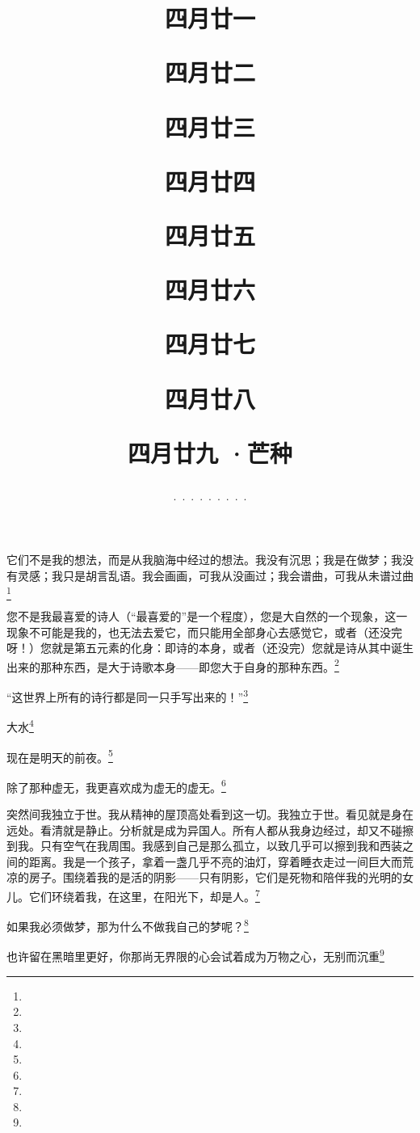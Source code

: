 \title{\date[d=28,m=5,y=2024][year:cn-y,年,month:cn,day:cn,日,·,weekday]·四月廿一 }
它们不是我的想法，而是从我脑海中经过的想法。我没有沉思；我是在做梦；我没有灵感；我只是胡言乱语。我会画画，可我从没画过；我会谱曲，可我从未谱过曲\footnote{ }

\title{\date[d=29,m=5,y=2024][year:cn-y,年,month:cn,day:cn,日,·,weekday]·四月廿二 }
您不是我最喜爱的诗人（“最喜爱的”是一个程度），您是大自然的一个现象，这一现象不可能是我的，也无法去爱它，而只能用全部身心去感觉它，或者（还没完呀！）您就是第五元素的化身：即诗的本身，或者（还没完）您就是诗从其中诞生出来的那种东西，是大于诗歌本身——即您大于自身的那种东西。\footnote{ }

\title{\date[d=30,m=5,y=2024][year:cn-y,年,month:cn,day:cn,日,·,weekday]·四月廿三 }
“这世界上所有的诗行都是同一只手写出来的！”\footnote{ }

\title{\date[d=31,m=5,y=2024][year:cn-y,年,month:cn,day:cn,日,·,weekday]·四月廿四 }
大水\footnote{ }

\title{\date[d=1,m=6,y=2024][year:cn-y,年,month:cn,day:cn,日,·,weekday]·四月廿五 }
现在是明天的前夜。\footnote{ }

\title{\date[d=2,m=6,y=2024][year:cn-y,年,month:cn,day:cn,日,·,weekday]·四月廿六 }
除了那种虚无，我更喜欢成为虚无的虚无。\footnote{ }

\title{\date[d=3,m=6,y=2024][year:cn-y,年,month:cn,day:cn,日,·,weekday]·四月廿七 }
突然间我独立于世。我从精神的屋顶高处看到这一切。我独立于世。看见就是身在远处。看清就是静止。分析就是成为异国人。所有人都从我身边经过，却又不碰擦到我。只有空气在我周围。我感到自己是那么孤立，以致几乎可以擦到我和西装之间的距离。我是一个孩子，拿着一盏几乎不亮的油灯，穿着睡衣走过一间巨大而荒凉的房子。围绕着我的是活的阴影——只有阴影，它们是死物和陪伴我的光明的女儿。它们环绕着我，在这里，在阳光下，却是人。\footnote{ }

\title{\date[d=4,m=6,y=2024][year:cn-y,年,month:cn,day:cn,日,·,weekday]·四月廿八 }
如果我必须做梦，那为什么不做我自己的梦呢？\footnote{ }

\title{\date[d=5,m=6,y=2024][year:cn-y,年,month:cn,day:cn,日,·,weekday]·四月廿九 ·芒种}
也许留在黑暗里更好，你那尚无界限的心会试着成为万物之心，无别而沉重\footnote{ }

